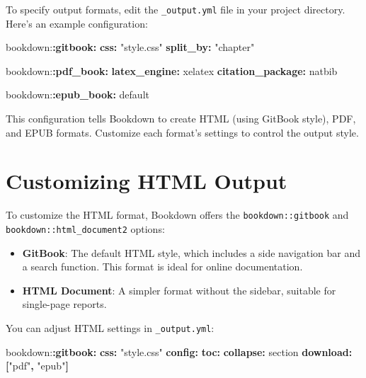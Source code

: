 \documentclass[
]{book}
\newenvironment{Shaded}{\begin{snugshade}}{\end{snugshade}}
\newcommand{\AttributeTok}[1]{\textcolor[rgb]{0.13,0.29,0.53}{#1}}
\newcommand{\FunctionTok}[1]{\textcolor[rgb]{0.13,0.29,0.53}{\textbf{#1}}}
\newcommand{\KeywordTok}[1]{\textcolor[rgb]{0.13,0.29,0.53}{\textbf{#1}}}
\newcommand{\StringTok}[1]{\textcolor[rgb]{0.31,0.60,0.02}{#1}}
\providecommand{\tightlist}{%
  \setlength{\itemsep}{0pt}\setlength{\parskip}{0pt}}
\theoremstyle{definition}
\theoremstyle{definition}
\theoremstyle{definition}
\theoremstyle{definition}
\theoremstyle{remark}
\begin{document}
To specify output formats, edit the \texttt{\_output.yml} file in your project directory. Here's an example configuration:

\begin{Shaded}
\begin{Highlighting}[]
\AttributeTok{bookdown:}\FunctionTok{:gitbook}\KeywordTok{:}
\AttributeTok{  }\FunctionTok{css}\KeywordTok{:}\AttributeTok{ }\StringTok{"style.css"}
\AttributeTok{  }\FunctionTok{split\_by}\KeywordTok{:}\AttributeTok{ }\StringTok{"chapter"}

\AttributeTok{bookdown:}\FunctionTok{:pdf\_book}\KeywordTok{:}
\AttributeTok{  }\FunctionTok{latex\_engine}\KeywordTok{:}\AttributeTok{ xelatex}
\AttributeTok{  }\FunctionTok{citation\_package}\KeywordTok{:}\AttributeTok{ natbib}

\AttributeTok{bookdown:}\FunctionTok{:epub\_book}\KeywordTok{:}\AttributeTok{ default}
\end{Highlighting}
\end{Shaded}

This configuration tells Bookdown to create HTML (using GitBook style), PDF, and EPUB formats. Customize each format's settings to control the output style.

\section{Customizing HTML Output}\label{customizing-html-output}

To customize the HTML format, Bookdown offers the \texttt{bookdown::gitbook} and \texttt{bookdown::html\_document2} options:

\begin{itemize}
\tightlist
\item
  \textbf{GitBook}: The default HTML style, which includes a side navigation bar and a search function. This format is ideal for online documentation.
\item
  \textbf{HTML Document}: A simpler format without the sidebar, suitable for single-page reports.
\end{itemize}

You can adjust HTML settings in \texttt{\_output.yml}:

\begin{Shaded}
\begin{Highlighting}[]
\AttributeTok{bookdown:}\FunctionTok{:gitbook}\KeywordTok{:}
\AttributeTok{  }\FunctionTok{css}\KeywordTok{:}\AttributeTok{ }\StringTok{"style.css"}
\AttributeTok{  }\FunctionTok{config}\KeywordTok{:}
\AttributeTok{    }\FunctionTok{toc}\KeywordTok{:}
\AttributeTok{      }\FunctionTok{collapse}\KeywordTok{:}\AttributeTok{ section}
\AttributeTok{    }\FunctionTok{download}\KeywordTok{:}\AttributeTok{ }\KeywordTok{[}\StringTok{"pdf"}\KeywordTok{,}\AttributeTok{ }\StringTok{"epub"}\KeywordTok{]}
\end{Highlighting}
\end{Shaded}
\end{document}
